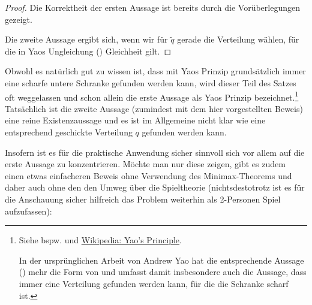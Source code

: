 \documentclass[a4paper,ngerman,12pt,bibtotoc]{scrartcl}
\theoremstyle{definition}
\theoremstyle{plain}
\theoremstyle{remark}
\renewcommand{\_}{\mathpunct{.}\,}
\newcommand{\?}{\,{:}\,}
\newcommand{\sq}{\tilde{q}}		%
\begin{document}
	\begin{proof}
		Die Korrektheit der ersten Aussage ist bereits durch die Vorüberlegungen gezeigt.
		
		Die zweite Aussage ergibt sich, wenn wir für $\sq$ gerade die Verteilung wählen, für die in Yaos Ungleichung () Gleichheit gilt.
	\end{proof}
	
	Obwohl es natürlich gut zu wissen ist, dass mit Yaos Prinzip grundsätzlich immer eine scharfe untere Schranke gefunden werden kann, wird dieser Teil des Satzes oft weggelassen und schon allein die erste Aussage als Yaos Prinzip bezeichnet.\footnote{Siehe bspw. \cite{OCCA} und \href{https://en.wikipedia.org/w/index.php?title=Yao\%27s\_principle\&oldid=568022187}{Wikipedia: Yao's Principle}.
		
		In der ursprünglichen Arbeit von Andrew Yao hat die entsprechende Aussage (\cite[Theorem 1]{Yao}) mehr die Form von  und umfasst damit insbesondere auch die Aussage, dass immer eine Verteilung gefunden werden kann, für die die Schranke scharf ist.}
	Tatsächlich ist die zweite Aussage (zumindest mit dem hier vorgestellten Beweis) eine reine Existenzaussage und es ist im Allgemeine nicht klar wie eine entsprechend \glqq geschickte\grqq{} Verteilung $q$ gefunden werden kann. 
	
	Insofern ist es für die praktische Anwendung sicher sinnvoll sich vor allem auf die erste Aussage zu konzentrieren. Möchte man nur diese zeigen, gibt es zudem einen etwas einfacheren Beweis ohne Verwendung des Minimax-Theorems und daher auch ohne den den Umweg über die Spieltheorie (nichtsdestotrotz ist es für die Anschauung sicher hilfreich das Problem weiterhin als 2-Personen Spiel aufzufassen):
	
\end{document}
